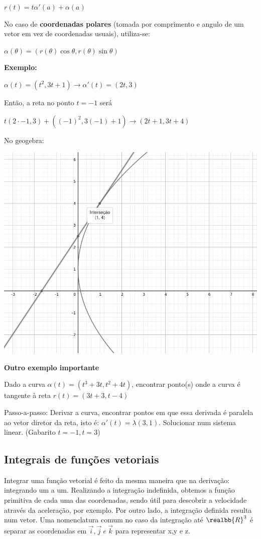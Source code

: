 \documentclass[letterpaper, 11pt]{article}
\begin{document}
\begin{center} $r(t) = t\alpha'(a) + \alpha(a)$ \end{center}

No caso de \textbf{coordenadas polares} (tomada por comprimento e angulo de um vetor em vez de coordenadas usuais), utiliza-se:

\begin{center} $\alpha(\theta) = (r(\theta)\cos\theta, r(\theta)\sin\theta)$ \end{center}

\textbf{Exemplo:}

\(\alpha(t) = (t^2, 3t+1) \rightarrow \alpha'(t) = (2t, 3)\)

Então, a reta no ponto \(t = -1\) será

\(t(2\cdot-1, 3) + ((-1)^2,3(-1)+1) \rightarrow (2t+1, 3t+4)\)

No geogebra:
\begin{center}
\includegraphics[width=.9\linewidth]{./img/tangente.png}
\end{center}

\textbf{Outro exemplo importante}

Dado a curva \(\alpha(t) = (t^3 +3t, t^2+4t)\), encontrar ponto(s) onde a curva é tangente à reta \(r(t) = (3t+3,t-4)\)

Passo-a-passo: Derivar a curva, encontrar pontos em que essa derivada é paralela ao vetor diretor da reta, isto é: \(\alpha'(t) = \lambda(3,1)\). Solucionar num sistema linear. (Gabarito \(t = -1, t = 3\))

\subsection{Integrais de funções vetoriais}
\label{sec:org7361aeb}
Integrar uma função vetorial é feito da mesma maneira que na derivação: integrando um a um. Realizando a integração indefinida, obtemos a função primitiva de cada uma das coordenadas, sendo útil para descobrir a velocidade através da aceleração, por exemplo.
Por outro lado, a integração definida resulta num vetor. Uma nomenclatura comum no caso da integração até \(\realbb{R}^3\) é separar as coordenadas em \(\vec{i}, \vec{j} \ e \ \vec{k}\) para representar x,y e z.
\end{document}
